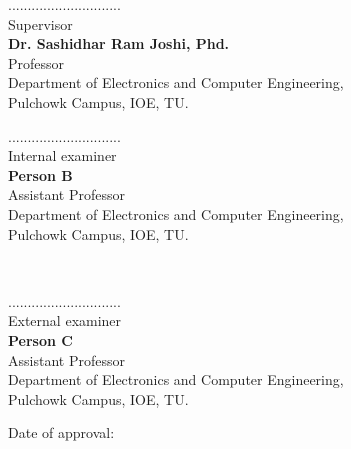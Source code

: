 \documentclass[12pt]{report}
\begin{document}
\vspace{1cm}
\begin{minipage}{.5\textwidth}
        \raggedright
    .............................\\
    Supervisor\\
    \textbf{Dr. Sashidhar Ram Joshi, Phd.}\\
    Professor\\
    Department of Electronics and Computer Engineering,\\
    Pulchowk Campus, IOE, TU.\\
    \end{minipage}%
    \begin{minipage}{0.5\textwidth}
    \raggedleft
    .............................\\
    Internal examiner\\
    \textbf{Person B}\\
    Assistant Professor\\
    Department of Electronics and Computer Engineering,\\
    Pulchowk Campus, IOE, TU.\\
    \end{minipage}\\
    \vspace{.8cm}
    \begin{center}
    .............................\\
    External examiner\\
    \textbf{Person C}\\
    Assistant Professor\\
    Department of Electronics and Computer Engineering,\\
    Pulchowk Campus, IOE, TU.\\
    \vspace{.6cm}
    \end{center}
\centerline{Date of approval:}
\end{document}
